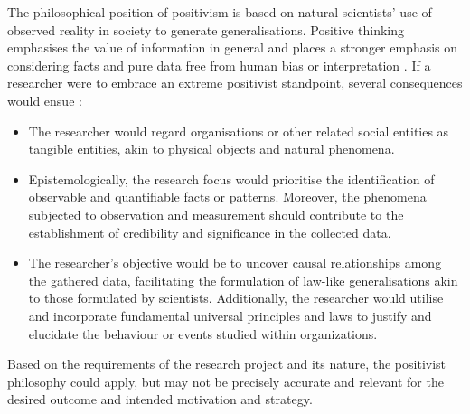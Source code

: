 \par{The philosophical position of positivism is based on natural scientists' use of observed reality in society to generate generalisations. Positive thinking emphasises the value of information in general and places a stronger emphasis on considering facts and pure data free from human bias or interpretation \citep{saunders2009research}. If a researcher were to embrace an extreme positivist standpoint, several consequences would ensue \citep{alharahsheh2020review}:
\begin{itemize}
    \item The researcher would regard organisations or other related social entities as tangible entities, akin to physical objects and natural phenomena.
    \item Epistemologically, the research focus would prioritise the identification of observable and quantifiable facts or patterns. Moreover, the phenomena subjected to observation and measurement should contribute to the establishment of credibility and significance in the collected data.
    \item The researcher's objective would be to uncover causal relationships among the gathered data, facilitating the formulation of law-like generalisations akin to those formulated by scientists. Additionally, the researcher would utilise and incorporate fundamental universal principles and laws to justify and elucidate the behaviour or events studied within organizations.
\end{itemize}}
\par{Based on the requirements of the research project and its nature, the positivist philosophy could apply, but may not be precisely accurate and relevant for the desired outcome and intended motivation and strategy.}
